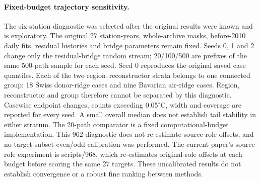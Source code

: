 \paragraph{Fixed-budget trajectory sensitivity.} The six-station diagnostic was selected after the original results were known and is exploratory. The original 27 station-years, whole-archive masks, before-2010 daily fits, residual histories and bridge parameters remain fixed. Seeds 0, 1 and 2 change only the residual-bridge random stream; 20/100/500 are prefixes of the same 500-path sample for each seed. Seed 0 reproduces the original saved case quantiles. Each of the two region--reconstructor strata belongs to one connected group: 18 Swiss donor-ridge cases and nine Bavarian air-ridge cases. Region, reconstructor and group therefore cannot be separated by this diagnostic. Casewise endpoint changes, counts exceeding 0.05$^{\circ}$C, width and coverage are reported for every seed. A small overall median does not establish tail stability in either stratum. The 20-path comparator is a fixed computational-budget implementation. This 962 diagnostic does not re-estimate source-role offsets, and no target-subset even/odd calibration was performed. The current paper's source-role experiment is scripts/968, which re-estimates original-role offsets at each budget before scoring the same 27 targets. These uncalibrated results do not establish convergence or a robust fine ranking between methods. 
